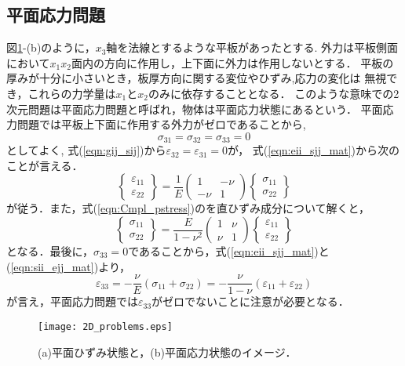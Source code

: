 \documentclass[10pt,a4j]{jbook}
\begin{document}
\subsection{平面応力問題}
図\ref{fig:fig6_2}-(b)のように，$x_3$軸を法線とするような平板があったとする.
外力は平板側面において$x_1x_2$面内の方向に作用し，上下面に外力は作用しないとする．
平板の厚みが十分に小さいとき，板厚方向に関する変位やひずみ,応力の変化は
無視でき，これらの力学量は$x_1$と$x_2$のみに依存することとなる．
このような意味での2次元問題は平面応力問題と呼ばれ，物体は平面応力状態にあるという．
平面応力問題では平板上下面に作用する外力がゼロであることから, 
\begin{equation}
 \sigma_{31}=\sigma_{32}=\sigma_{33}=0
\end{equation}
としてよく, 式(\ref{eqn:gij_sij})から$\varepsilon_{32}=\varepsilon_{31}=0$が，
式(\ref{eqn:eii_sjj_mat})から次のことが言える．
\begin{equation}
	\left\{ 
	\begin{array}{*{20}{c}}
	\varepsilon _{11}\\
	\varepsilon _{22}
	\end{array}
	\right\} 
	= 
	\frac{1}{E}\left( 
	\begin{array}{*{20}{c}}
	1& - \nu \\
	 - \nu &1
	\end{array}
	\right)
	\left\{ 
	\begin{array}{*{20}{c}}
	\sigma _{11}\\
	\sigma _{22}
	\end{array} 
	\right\}
	\label{eqn:Cmpl_pstress}
\end{equation}
が従う．また，式(\ref{eqn:Cmpl_pstress})のを直ひずみ成分について解くと，
\begin{equation}
	\left\{ 
	\begin{array}{*{20}{c}}
	\sigma _{11}\\
	\sigma _{22}
	\end{array}
	\right\} 
	= 
	\frac{E}{1-\nu^2}\left( 
	\begin{array}{*{20}{c}}
	1&  \nu \\
	  \nu &1
	\end{array}
	\right)
	\left\{ 
	\begin{array}{*{20}{c}}
	\varepsilon _{11}\\
	\varepsilon _{22}
	\end{array} 
	\right\}
	\label{eqn:Hooke_pstress}
\end{equation}
となる．最後に，$\sigma_{33}=0$であることから，式(\ref{eqn:eii_sjj_mat})と(\ref{eqn:sii_ejj_mat})より，
\begin{equation}
	\varepsilon_{33}=-\frac{\nu}{E} \left( \sigma_{11}+\sigma_{22} \right)
	= -\frac{\nu}{1-\nu}\left(\varepsilon_{11}+\varepsilon_{22}\right)
\end{equation}
が言え，平面応力問題では$\varepsilon_{33}$がゼロでないことに注意が必要となる．
\begin{figure}[h]
	\begin{center}
	\texttt{[image: 2D\_problems.eps]} 
	\end{center}
	\caption{
	(a)平面ひずみ状態と，(b)平面応力状態のイメージ．
	 } 
	\label{fig:fig6_2}
\end{figure}
\end{document}
